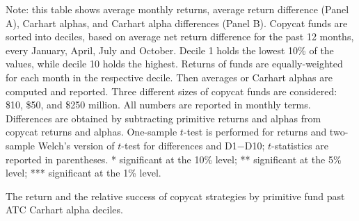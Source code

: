 \documentclass[12pt, a4]{article}
\begin{document}
\begin{landscape}
\begin{table*}[p]
\begin{threeparttable}
			\label{tab:past_return_difference_deciles}%
			\begin{tablenotes}
				\tiny
				\item Note: this table shows average monthly returns, average return difference (Panel A), Carhart alphas, and Carhart alpha differences (Panel B). Copycat funds are sorted into deciles, based on average net return difference for the past 12 months, every January, April, July and October. Decile 1 holds the lowest 10\% of the values, while decile 10 holds the highest. Returns of funds are equally-weighted for each month in the respective decile. Then averages or Carhart alphas are computed and reported. Three different sizes of copycat funds are considered: \$10, \$50, and \$250 million. All numbers are reported in monthly terms. Differences are obtained by subtracting primitive returns and alphas from copycat returns and alphas. One-sample $t$-test is performed for returns and two-sample Welch's version of $t$-test for differences and D1$-$D10; $t$-statistics are reported in parentheses. * significant at the 10\% level; ** significant at the 5\% level; *** significant at the 1\% level.
			\end{tablenotes}
		\end{threeparttable}
	\end{table*}
	
		\begin{table*}[p] %
		\centering
		\ssmall
		\newcommand{\dspacing}{1ex} %
		\newcommand{\panelspacing}{1.5ex} %
		\newcommand{\decilename}[1]{\multirow{2}{*}{#1}} %
		\newcommand{\mc}[3]{\multicolumn{#1}{#2}{#3}}
		\begin{threeparttable}
			\centering
			\caption{The return and the relative success of copycat strategies by primitive fund past \textsc{ATC} Carhart alpha deciles.}
			
			
			

\end{threeparttable}
\end{table*}
\end{landscape}
\end{document}
